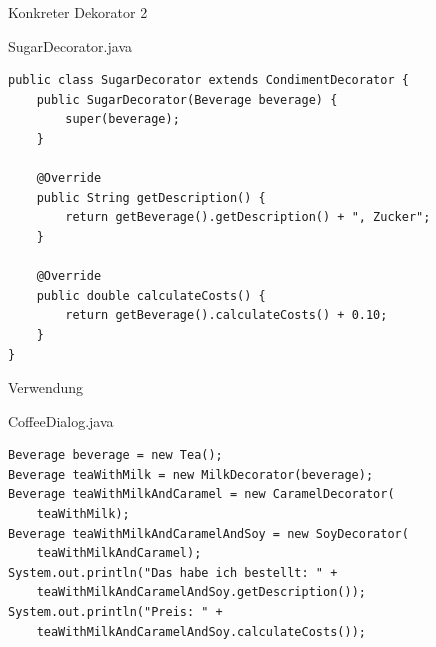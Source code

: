 \begin{frame}[fragile]{Konkreter Dekorator 2}
	\begin{exampleblock}{SugarDecorator.java}
        \begin{lstlisting}
public class SugarDecorator extends CondimentDecorator {
    public SugarDecorator(Beverage beverage) {
        super(beverage);
    }

    @Override
    public String getDescription() {
        return getBeverage().getDescription() + ", Zucker";
    }

    @Override
    public double calculateCosts() {
        return getBeverage().calculateCosts() + 0.10;
    }
}

        \end{lstlisting}
	\end{exampleblock}
\end{frame}

\begin{frame}[fragile]{Verwendung}
	\begin{exampleblock}{CoffeeDialog.java}
        \begin{lstlisting}
Beverage beverage = new Tea();
Beverage teaWithMilk = new MilkDecorator(beverage);
Beverage teaWithMilkAndCaramel = new CaramelDecorator(
    teaWithMilk);
Beverage teaWithMilkAndCaramelAndSoy = new SoyDecorator(
    teaWithMilkAndCaramel);
System.out.println("Das habe ich bestellt: " + 
    teaWithMilkAndCaramelAndSoy.getDescription());
System.out.println("Preis: " + 
    teaWithMilkAndCaramelAndSoy.calculateCosts());
        \end{lstlisting}
	\end{exampleblock}
\end{frame}



